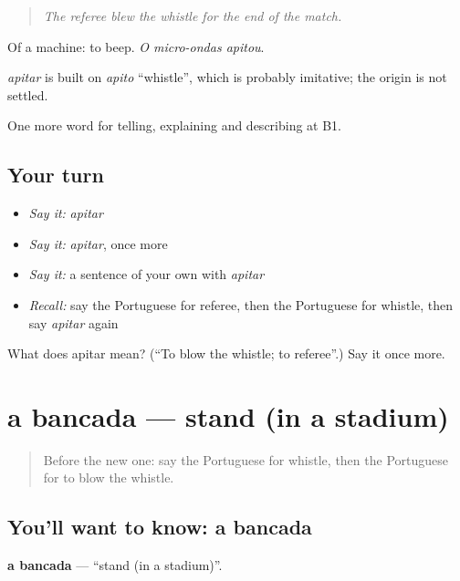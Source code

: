 \begin{quote}
\emph{The referee blew the whistle for the end of the match.}
\end{quote}

Of a machine: to beep. \emph{O micro-ondas apitou}.

\begin{cousinweb}
\emph{apitar} is built on \emph{apito} \textquotedblleft{}whistle\textquotedblright{}, which is probably imitative; the origin is not settled.
\end{cousinweb}

\begin{grammarlens}[title={What you've built}]
One more word for telling, explaining and describing at B1.
\end{grammarlens}

\subsection*{Your turn}
\begin{itemize}
\raggedright
  \item \emph{Say it:} \emph{apitar}
  \item \emph{Say it:} \emph{apitar}, once more
  \item \emph{Say it:} a sentence of your own with \emph{apitar}
  \item \emph{Recall:} say the Portuguese for referee, then the Portuguese for whistle, then say \emph{apitar} again
\end{itemize}

\begin{tcolorbox}[breakable,colback=teal!4,colframe=teal!35!black,title={Before you move on}]
What does apitar mean? (\textquotedblleft{}To blow the whistle; to referee\textquotedblright{}.) Say it once more.
\end{tcolorbox}
\section[a bancada]{a bancada — stand (in a stadium)}

\label{lesson:PT-C508-bancada}



\begin{quote}
Before the new one: say the Portuguese for whistle, then the Portuguese for to blow the whistle.
\end{quote}

\subsection*{You'll want to know: a bancada}
\textbf{a bancada} — \textquotedblleft{}stand (in a stadium)\textquotedblright{}.

